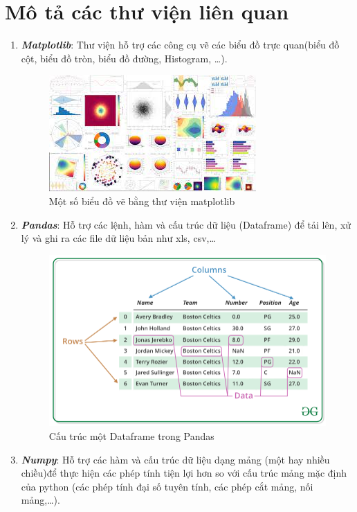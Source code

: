 \documentclass[a4paper, 12pt]{article}
\begin{document}
\section{Mô tả các thư viện liên quan}
\begin{enumerate}
    \item \textbf{\textit{Matplotlib}}: Thư viện hỗ trợ các công cụ vẽ các biểu đồ trực quan(biểu đồ cột, biểu đồ tròn, biểu đồ đường, Histogram, \dots).
        \begin{figure}[H]
            \centering
                \includegraphics[scale=1]{img/matplotlib}
                \caption{Một số biểu đồ vẽ bằng thư viện matplotlib}
        \end{figure}
    \item \textbf{\textit{Pandas}}: Hỗ trợ các lệnh, hàm và cấu trúc dữ liệu (Dataframe) để tải lên, xử lý và ghi ra các file dữ liệu bản như xls, csv,\dots
        \begin{figure}[H]
            \centering
                \includegraphics[scale=1]{img/pandas_df}
                \caption{Cấu trúc một Dataframe trong Pandas}
        \end{figure}
    \item \textbf{\textit{Numpy}}: Hỗ trợ các hàm và cấu trúc dữ liệu dạng mảng (một hay nhiều chiều)để thực hiện các phép tính tiện lợi hơn so với cấu trúc mảng mặc định của python (các phép tính đại số tuyên tính, các phép cắt mảng, nối mảng,\dots).

\end{enumerate}
\end{document}

